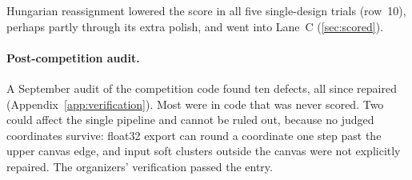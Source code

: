 Hungarian reassignment lowered the score in all five single-design trials (row~10),
perhaps partly through its extra polish, and went into Lane~C (\cref{sec:scored}).

\paragraph{Post-competition audit.} A September audit of the competition code found
ten defects, all since repaired (Appendix~\ref{app:verification}). Most were in code
that was never scored. Two could affect the single pipeline and cannot be ruled out,
because no judged coordinates survive: float32 export can round a coordinate one step
past the upper canvas edge, and input soft clusters outside the canvas were not
explicitly repaired. The organizers' verification passed the entry.
